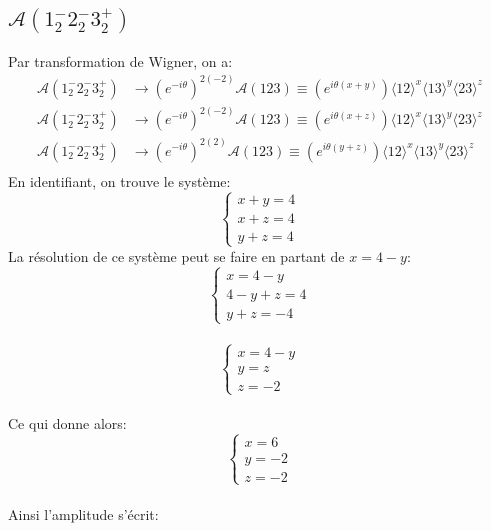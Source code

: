 \documentclass[12pt, a4paper]{article}
\begin{document}
	\subsection{$\mathcal{A}(1^{-}_2 2^{-}_2 3^{+}_2)$}
	Par transformation de Wigner, on a:
	\begin{equation}
		\begin{split}
			\mathcal{A}(1^{-}_2 2^{-}_2 3^{+}_2) &\rightarrow (e^{-i \theta})^{2(-2)}\mathcal{A}(123)\equiv (e^{i \theta(x+y)})\langle 12 \rangle^x \langle 13 \rangle^y \langle 23 \rangle^z \\
			\mathcal{A}(1^{-}_2 2^{-}_2 3^{+}_2) &\rightarrow (e^{-i \theta})^{2(-2)}\mathcal{A}(123)\equiv (e^{i \theta(x+z)})\langle 12 \rangle^x \langle 13 \rangle^y \langle 23 \rangle^z \\
			\mathcal{A}(1^{-}_2 2^{-}_2 3^{+}_2) &\rightarrow (e^{-i \theta})^{2(2)}\mathcal{A}(123)\equiv (e^{i \theta(y+z)})\langle 12 \rangle^x \langle 13 \rangle^y \langle 23 \rangle^z \\
		\end{split}
	\end{equation}
	En identifiant, on trouve le système:
	\[
	\begin{cases}
		x+y=4\\
		x+z=4\\
		y+z=4
	\end{cases}
	\]
	La résolution de ce système peut se faire en partant de $x=4-y$:\\
	\[
	\begin{cases}
		x=4-y\\
		4-y+z=4\\
		y+z=-4
	\end{cases}
	\]\\
	\[
	\begin{cases}
		x=4-y\\
		y=z\\
		z=-2
	\end{cases}
	\]\\
	Ce qui donne alors:
	\[
	\begin{cases}
		x=6\\
		y=-2\\
		z=-2
	\end{cases}
	\]\\
	Ainsi l'amplitude s'écrit:
	\begin{center}
		\Large
	\end{center}
\end{document}
